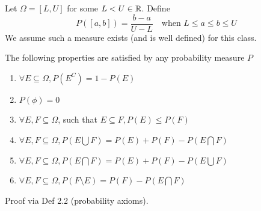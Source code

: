 \begin{example}
    Let $\Omega =[L,U]$ for some $L < U \in \mathbb{R}$. Define
    \[P([a,b]) = \frac{b-a}{U-L} \quad \text{when } L \leq a \leq b \leq U\]
    We assume such a measure exists (and is well defined) for this class.
\end{example}

\begin{reqproof}
\begin{proposition}[][2.3]
The following properties are satisfied by any probability measure $P$
\begin{enumerate}
    \item $\forall E \subseteq \Omega, P(E^C) = 1 - P(E)$
    \item $P(\phi) = 0$
    \item $\forall E, F \subseteq \Omega$, such that $E \subseteq F, P(E) \leq P(F)$ 
    \item $\forall E, F \subseteq \Omega, P(E\bigcup F) = P(E)+P(F) - P(E\bigcap F)$
    \item $\forall E, F \subseteq \Omega, P(E\bigcap F) = P(E)+P(F)-P(E\bigcup F)$
    \item $\forall E, F \subseteq \Omega, P(F \setminus E) = P(F) - P(E\bigcap F)$
\end{enumerate}
Proof via Def 2.2 (probability axioms).
\end{proposition}
\end{reqproof}

